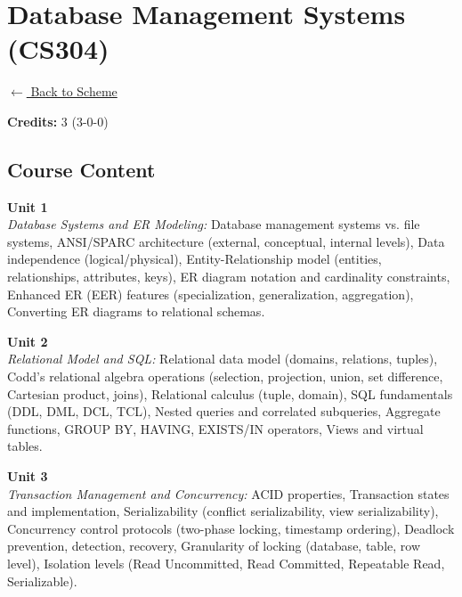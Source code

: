 \section*{Database Management Systems (CS304)}
\label{course:CS304}

\noindent \small{\hyperref[main:scheme]{$\leftarrow$ Back to Scheme}} \vspace{0.5cm}

\noindent \textbf{Credits:} 3 (3-0-0)

\subsection*{Course Content}
\noindent\textbf{Unit 1} \\
\textit{Database Systems and ER Modeling:} Database management systems vs. file systems, ANSI/SPARC architecture (external, conceptual, internal levels), Data independence (logical/physical), Entity-Relationship model (entities, relationships, attributes, keys), ER diagram notation and cardinality constraints, Enhanced ER (EER) features (specialization, generalization, aggregation), Converting ER diagrams to relational schemas.

\vspace{0.3cm}

\noindent\textbf{Unit 2} \\
\textit{Relational Model and SQL:} Relational data model (domains, relations, tuples), Codd's relational algebra operations (selection, projection, union, set difference, Cartesian product, joins), Relational calculus (tuple, domain), SQL fundamentals (DDL, DML, DCL, TCL), Nested queries and correlated subqueries, Aggregate functions, GROUP BY, HAVING, EXISTS/IN operators, Views and virtual tables.

\vspace{0.3cm}

\noindent\textbf{Unit 3} \\
\textit{Transaction Management and Concurrency:} ACID properties, Transaction states and implementation, Serializability (conflict serializability, view serializability), Concurrency control protocols (two-phase locking, timestamp ordering), Deadlock prevention, detection, recovery, Granularity of locking (database, table, row level), Isolation levels (Read Uncommitted, Read Committed, Repeatable Read, Serializable).

\vspace{0.3cm}

